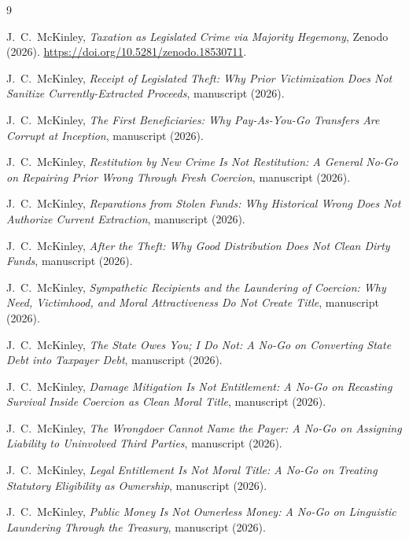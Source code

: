 \documentclass[12pt]{article}
\begin{document}
\begin{thebibliography}{9}

J.\ C.\ McKinley,
\textit{Taxation as Legislated Crime via Majority Hegemony},
Zenodo (2026).
\href{https://doi.org/10.5281/zenodo.18530711}{https://doi.org/10.5281/zenodo.18530711}.

J.\ C.\ McKinley,
\textit{Receipt of Legislated Theft: Why Prior Victimization Does Not Sanitize Currently-Extracted Proceeds},
manuscript (2026).

J.\ C.\ McKinley,
\textit{The First Beneficiaries: Why Pay-As-You-Go Transfers Are Corrupt at Inception},
manuscript (2026).

J.\ C.\ McKinley,
\textit{Restitution by New Crime Is Not Restitution: A General No-Go on Repairing Prior Wrong Through Fresh Coercion},
manuscript (2026).

J.\ C.\ McKinley,
\textit{Reparations from Stolen Funds: Why Historical Wrong Does Not Authorize Current Extraction},
manuscript (2026).

J.\ C.\ McKinley,
\textit{After the Theft: Why Good Distribution Does Not Clean Dirty Funds},
manuscript (2026).

J.\ C.\ McKinley,
\textit{Sympathetic Recipients and the Laundering of Coercion: Why Need, Victimhood, and Moral Attractiveness Do Not Create Title},
manuscript (2026).

J.\ C.\ McKinley,
\textit{The State Owes You; I Do Not: A No-Go on Converting State Debt into Taxpayer Debt},
manuscript (2026).

J.\ C.\ McKinley,
\textit{Damage Mitigation Is Not Entitlement: A No-Go on Recasting Survival Inside Coercion as Clean Moral Title},
manuscript (2026).

J.\ C.\ McKinley,
\textit{The Wrongdoer Cannot Name the Payer: A No-Go on Assigning Liability to Uninvolved Third Parties},
manuscript (2026).

J.\ C.\ McKinley,
\textit{Legal Entitlement Is Not Moral Title: A No-Go on Treating Statutory Eligibility as Ownership},
manuscript (2026).

J.\ C.\ McKinley,
\textit{Public Money Is Not Ownerless Money: A No-Go on Linguistic Laundering Through the Treasury},
manuscript (2026).


\end{thebibliography}
\end{document}
